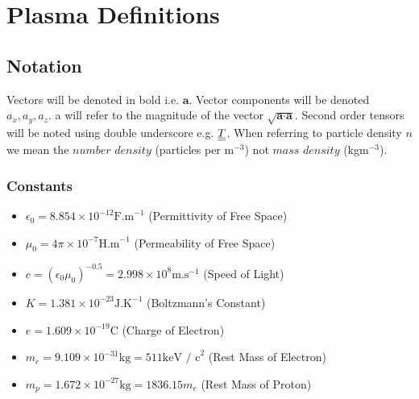 \section{Plasma Definitions}
\subsection{Notation}
Vectors will be denoted in bold i.e. $\textbf{a}$. Vector components will be denoted $a_x, a_y, a_z$. a will refer to the magnitude of the vector $\sqrt{{\textbf{a} \cdot \textbf{a}}}$. Second order tensors will be noted using double underscore e.g. $\underline{\underline{T}}$. When referring to particle density $n$ we mean the $\textit{number density}$ (particles per m$^{-3}$) not  $\textit{mass density}$ (kgm$^{-3}$).

\subsubsection{Constants}
\begin{itemize}
	\item[] $\epsilon_0 = 8.854 \times 10^{-12} \text{F.m}^{-1}$ \quad(Permittivity of Free Space) 
	\item[] $\mu_0 = 4\pi \times 10^{-7} \text{H.m}^{-1} $ \quad(Permeability of Free Space)
	\item[] $c = \left(\epsilon_0 \mu_0\right)^{-0.5} = 2.998 \times 10^{8} \text{m.s}^{-1}$ \quad(Speed of Light)
	\item[] $K = 1.381 \times 10^{-23} \text{J.K}^{-1}$ \quad(Boltzmann's Constant)
	\item[] $e = 1.609 \times 10^{-19} \text{C}$ \quad(Charge of Electron)
	\item[] $m_e = 9.109 \times 10^{-31} \text{kg} = 511 \text{keV / c}^2$ \quad(Rest Mass of Electron)
	\item[] $m_p = 1.672 \times 10^{-27} \text{kg} = 1836.15m_e$ \quad(Rest Mass of Proton)
\end{itemize}

